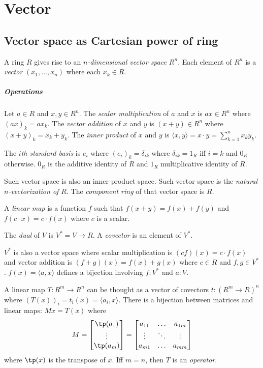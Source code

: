 \chapter{Vector}

\section{Vector space as Cartesian power of ring}

A ring \(R\) gives rise to an \emph{\(n\)-dimensional vector space} \(R^n\).
Each element of \(R^n\) is a \emph{vector} \((x_1,\ldots,x_n)\)
where each \(x_k \in R\).

\paragraph{Operations}
Let \(a \in R\) and \(x,y\in R^n\).
The \emph{scalar multiplication} of \(a\) and \(x\) is \(ax \in R^n\) where \((ax)_k = a x_k\).
The \emph{vector addition} of \(x\) and \(y\) is \((x+y) \in R^n\) where \((x+y)_k = x_k+y_k\).
The \emph{inner product} of \(x\) and \(y\) is \(\langle x,y \rangle = x \cdot y = \sum_{k=1}^n x_k y_k\).

The \emph{\(i\)th standard basis} is \(e_i\) where \((e_i)_k = \delta_{ik}\)
where \(\delta_{ik} = 1_R\) iff \(i=k\) and \(0_R\) otherwise.
\(0_R\) is the additive identity of \(R\)
and \(1_R\) multiplicative identity of \(R\).

Such vector space is also an inner product space.
Such vector space is the \emph{natural \(n\)-vectorization of \(R\)}.
The \emph{component ring} of that vector space is \(R\).

A \emph{linear map} is a function \(f\) such that \(f(x+y) = f(x) + f(y)\)
and \(f(c \cdot x) = c \cdot f(x)\) where \(c\) is a scalar.

The \emph{dual} of \(V\) is \(V^* = V \to R\).
A \emph{covector} is an element of \(V^*\).

\(V^*\) is also a vector space
where scalar multiplication is
\((cf)(x) = c \cdot f(x)\)
and vector addition is
\((f+g)(x) = f(x)+g(x)\)
where \(c \in R\) and \(f,g \in V^*\).
\(f(x) = \langle a,x\rangle\) defines a bijection involving \(f:V^*\) and \(a:V\).

A linear map \(T : R^m \to R^n\) can be thought
as a vector of covectors \(t : (R^m \to R)^n\) where
\(
(T(x))_i = t_i(x) = \langle a_i, x \rangle
\).
There is a bijection between matrices and linear maps:
\(Mx = T(x)\) where
\[
M = \begin{bmatrix}\tp(a_1)\\\vdots\\\tp(a_m)\end{bmatrix}
= \begin{bmatrix}a_{11} & \ldots & a_{1m} \\ \vdots & \ddots & \vdots \\ a_{m1} & \ldots & a_{mm}\end{bmatrix}
\]
where \(\tp(x)\) is the transpose of \(x\).
Iff $m = n$, then \(T\) is an \emph{operator}.

